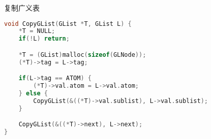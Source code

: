 \documentclass{../../note}
\begin{document}
复制广义表
\begin{lstlisting}[language=C]
void CopyGList(GList *T, GList L) {
    *T = NULL;
    if(!L) return;

    *T = (GList)malloc(sizeof(GLNode));
    (*T)->tag = L->tag;

    if(L->tag == ATOM) {
        (*T)->val.atom = L->val.atom;
    } else {
        CopyGList(&((*T)->val.sublist), L->val.sublist);
    }

    CopyGList(&((*T)->next), L->next);
}
\end{lstlisting}
\end{document}
